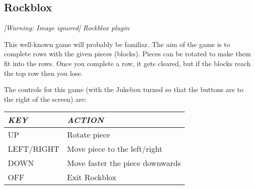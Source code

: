 \subsection{Rockblox}
{\centering\itshape
  [Warning: Image ignored] %
 \newline
Rockblox plugin
\par}

This well{}-known game will probably be familiar. The aim of the game is
to complete rows with the given pieces (blocks). Pieces can be rotated
to make them fit into the rows.  Once you complete a row, it gets
cleared, but if the blocks reach the top row then you lose.

The controls for this game (with the Jukebox turned so that the buttons
are to the right of the screen) are:

\begin{center}\begin{tabular}{|p{3.487cm}|p{9.657001cm}|}
\hline
{\centering\bfseries\itshape
KEY
\par}
&
{\centering\bfseries\itshape
ACTION
\par}
\\\hline
{\centering
UP
\par}
&
Rotate piece
\\\hline
{\centering
LEFT/RIGHT
\par}
&
Move piece to the left/right
\\\hline
{\centering
DOWN
\par}
&
Move faster the piece downwards
\\\hline
{\centering
OFF
\par}
&
Exit Rockblox
\\\hline
\end{tabular}\end{center}

